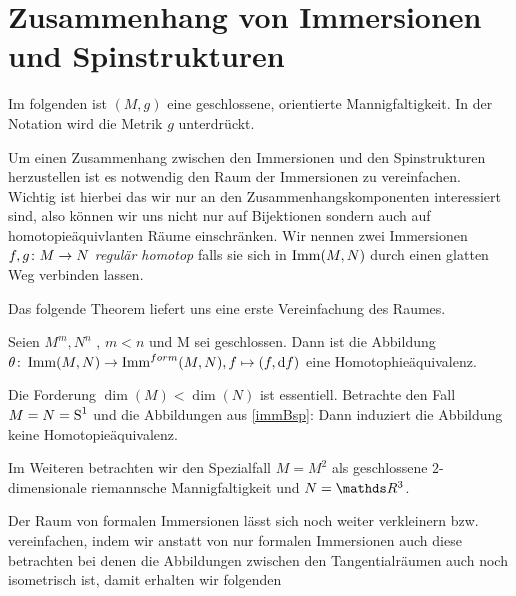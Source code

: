 


\section{Zusammenhang von Immersionen und Spinstrukturen}

Im folgenden ist $(M,g)$ eine geschlossene, orientierte Mannigfaltigkeit.
In der Notation wird die Metrik $g$ unterdrückt.


Um einen Zusammenhang zwischen den Immersionen und den Spinstrukturen
herzustellen ist es notwendig den Raum der Immersionen zu
vereinfachen.  Wichtig ist hierbei das wir nur an den
Zusammenhangskomponenten interessiert sind, also können wir uns nicht
nur auf Bijektionen sondern auch auf homotopieäquivlanten Räume
einschränken.  Wir nennen zwei Immersionen $ \abb{f,g}{M}{N} $
\textit{regulär homotop} falls sie sich in $ \Imm{M}{N} $ durch einen
glatten Weg verbinden lassen.

 Das folgende Theorem liefert uns eine erste Vereinfachung des Raumes. 
\begin{Thm}
	Seien $M^m,N^n$ \mfgen, $m<n$ und M sei geschlossen. Dann ist die Abbildung
	$\abb{\theta}{\Imm{M}{N}}{\Immf{M}{N}}, f \mapsto (f,\mathrm{d} f)$ eine Homotophieäquivalenz.
\end{Thm}

\begin{Bsp}
	Die Forderung $ \dim(M)<\dim(N) $ ist essentiell. Betrachte 
	den Fall $ M=N=\S^1 $ und die Abbildungen aus \cref{immBsp}:
	Dann induziert die Abbildung 
	keine Homotopieäquivalenz. 
\end{Bsp}

Im Weiteren betrachten wir den Spezialfall $ M=M^2 $ als geschlossene $ 2 $-dimensionale riemannsche Mannigfaltigkeit und
$ N=\R^3 $.

Der Raum von formalen Immersionen lässt sich noch weiter verkleinern
bzw. vereinfachen, indem wir anstatt von nur formalen Immersionen auch
diese betrachten bei denen die Abbildungen zwischen den
Tangentialräumen auch noch isometrisch ist, damit erhalten wir
folgenden


